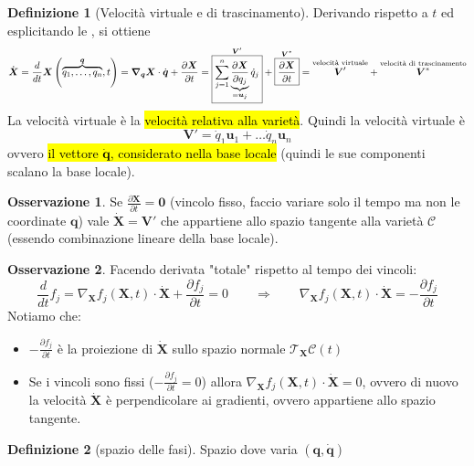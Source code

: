 \documentclass[a4paper,10pt]{article}
\theoremstyle{definition}
\newcommand{\bv}{\boldsymbol} %
\theoremstyle{indentdefinition}
\newtheorem{defn}{Definizione}[section]
\theoremstyle{indenttheorem}
\theoremstyle{myremark}
\newtheorem*{rem*}{Osservazione}
\theoremstyle{indentgeneral}
\begin{document}
\begin{defn}[Velocità virtuale e di trascinamento]  
 Derivando rispetto a $t$ ed esplicitando le ,
si ottiene
\[
\dot{\boldsymbol{X}}=\frac{d}{dt}\boldsymbol{X}\left(\overset{\bv{q}}{\overbrace{q_{1},\ldots,q_{n}}},t\right)=\grad_{\bv{q}}\bv{X}\cdot\dot{\bv{q}}+\frac{\partial \bv{X}}{\partial t}=\overset{\boldsymbol{V}'}{\boxed{\sum_{j=1}^{n}\underbrace{\frac{\partial\boldsymbol{X}}{\partial q_{j}}}_{=\bv{u}_j}\dot{q}_{j}}}+\overset{\boldsymbol{V}^{*}}{\boxed{\frac{\partial\boldsymbol{X}}{\partial t}}}=\overset{\text{velocità virtuale}}{\boldsymbol{V}'}+\overset{\text{velocità di trascinamento}}{\boldsymbol{V}^{*}}
\]
La velocità virtuale è la \hl{velocità relativa alla varietà}. Quindi la velocità virtuale è 
$$\bv{V}'=\dot{q}_1\bv{u}_1+\dots\dot{q}_n\bv{u}_n$$
ovvero \hl{il vettore $\dot{\bv{q}}$, considerato nella base locale} (quindi le sue componenti scalano la base locale).
\end{defn}
\begin{rem*}
Se $\frac{\partial\boldsymbol{X}}{\partial t}=\boldsymbol{0}$ (vincolo
fisso, faccio variare solo il tempo ma non le coordinate $\bv{q}$) vale $\dot{\boldsymbol{X}}=\boldsymbol{V}'$ che appartiene
allo spazio tangente alla varietà $\mathcal{C}$ (essendo combinazione lineare della base locale).
\end{rem*}


\begin{rem*} Facendo derivata "totale" rispetto al tempo dei vincoli:
    \[
\frac{d}{dt}f_j=\nabla_{\boldsymbol{X}}f_{j}\left(\boldsymbol{X},t\right)\cdot\dot{\boldsymbol{X}}+\frac{\partial f_{j}}{\partial t}=0\qquad\Longrightarrow\qquad\nabla_{\boldsymbol{X}}f_{j}\left(\boldsymbol{X},t\right)\cdot\dot{\boldsymbol{X}}=-\frac{\partial f_{j}}{\partial t}
\]
Notiamo che:
\begin{itemize}
    \item $-\frac{\partial f_{j}}{\partial t}$ è la proiezione di $\dot{\bv{X}}$ sullo spazio normale $\mathcal{T}_{\bv{X}}\mathcal{C}(t)$
    \item Se i vincoli sono fissi ($-\frac{\partial f_{j}}{\partial t}=0$) allora $\nabla_{\boldsymbol{X}}f_{j}\left(\boldsymbol{X},t\right)\cdot\dot{\boldsymbol{X}}=0$, ovvero di nuovo la velocità $\dot{\bv{X}}$ è perpendicolare ai gradienti, ovvero appartiene allo spazio tangente.
\end{itemize}
\end{rem*}

\begin{defn}[spazio delle fasi]
\label{def:spazio-delle-fasi}Spazio dove varia $\left(\bv{q},\dot{\bv{q}}\right)$
\end{defn}
\end{document}

